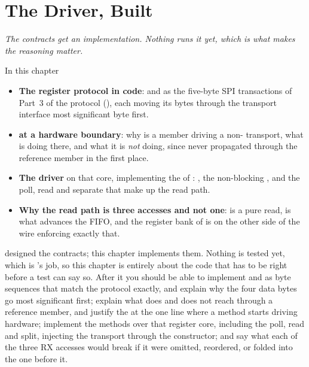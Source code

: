 
\chapter{The Driver, Built}
\label{c7:ch}

{\large\itshape The contracts get an implementation. Nothing runs it yet, which is what makes the
reasoning matter.\par}

\begin{chapterbox}{In this chapter}
\begin{itemize}
  \item \textbf{The register protocol in code}:  and  as the
    five-byte SPI transactions of Part~3 of the protocol (), each moving its
    bytes through the transport interface most significant byte first.
  \item \textbf{ at a hardware boundary}: why  is a  member
    driving a non- transport, what  is doing there, and what it is
    \emph{not} doing, since  never propagated through the reference member in the first
    place.
  \item \textbf{The  driver} on that core, implementing the  of
    : , the non-blocking , and the poll, read and separate
     that make up the read path.
  \item \textbf{Why the read path is three accesses and not one}:  is a pure read,
     is what advances the FIFO, and the register bank of  is on the other
    side of the wire enforcing exactly that.
\end{itemize}
\end{chapterbox}

 designed the contracts; this chapter implements them. Nothing is tested yet, which is
's job, so this chapter is entirely about the code that has to be right before a test can
say so. After it you should be able to implement  and  as byte
sequences that match the protocol exactly, and explain why the four data bytes go most significant
first; explain what  does and does not reach through a reference member, and justify the
 at the one line where a  method starts driving hardware; implement the
 methods over that register core, including the poll, read and  split,
injecting the transport through the constructor; and say what each of the three RX accesses would
break if it were omitted, reordered, or folded into the one before it.

